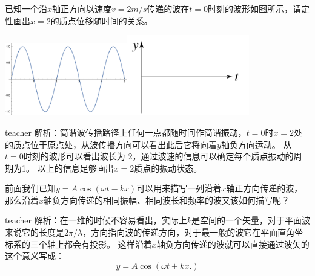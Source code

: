 \begin{example}
已知一个沿$x$轴正方向以速度$v=2\unit{m/s}$传递的波在$t=0$时刻的波形如图所示，请定性画出$x=2$的质点位移随时间的关系。
\begin{center}
\includegraphics[width = 0.4\textwidth]{images/ow-problem-1.pdf}\includegraphics[width = 0.4\textwidth]{images/ow-problem-1-1.pdf}
\end{center}
\begin{taggedblock}{teacher}
\noindent
解析：简谐波传播路径上任何一点都随时间作简谐振动，$t=0$时$x=2$处的质点位于原点处，从波传播方向可以看出此后它将向着$y$轴负方向运动。
从$t=0$时刻的波形可以看出波长为 2，通过波速的信息可以确定每个质点振动的周期为1。
以上的信息足够画出$x=2$质点的振动状态。
\end{taggedblock}
\end{example}


\begin{example}
前面我们已知$y = A\cos(\omega t-kx)$可以用来描写一列沿着$x$轴正方向传递的波，那么沿着$x$轴负方向传递的相同振幅、相同波长和频率的波又该如何描写呢？
\begin{taggedblock}{teacher}
\newline
解析：在一维的时候不容易看出，实际上$k$是空间的一个矢量，对于平面波来说它的长度是$2\pi/ \lambda$，方向指向波的传递方向，对于最一般的波它在平面直角坐标系的三个轴上都会有投影。
这样沿着$x$轴负方向传递的波就可以直接通过波矢的这个意义写成：
\[y = A \cos(\omega t + kx.)\]
\end{taggedblock}
\end{example}


